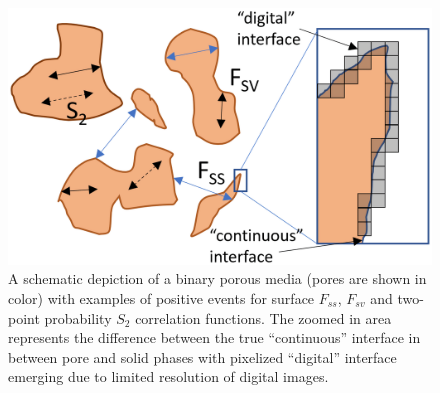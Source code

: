 \documentclass[reprint,amsmath,amssymb,aps,pre,showkeys,showpacs]{revtex4-1}
\begin{document}
\begin{figure}[ht]
  \centering
  \includegraphics[width=0.9\linewidth]{images/scheme.png}
  \caption[]{A schematic depiction of a binary porous media (pores are shown in
    color) with examples of positive events for surface $F_{ss}$, $F_{sv}$ and
    two-point probability $S_2$ correlation functions. The zoomed in area
    represents the difference between the true ``continuous'' interface in
    between pore and solid phases with pixelized ``digital'' interface emerging
    due to limited resolution of digital images.}
  \label{fig:scheme}
\end{figure}
\end{document}
